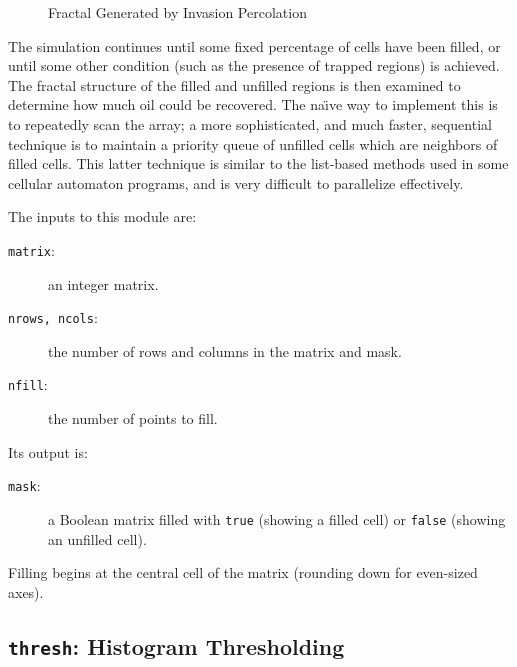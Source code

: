 \begin{figure}
\begin{center}
{\textwidth{}}
{\textwidth{}}
{\textwidth{}}
{\textwidth{}}
\end{center}
\caption{Fractal Generated by Invasion Percolation\label{f:invperc2}}
\end{figure}

The simulation continues until
some fixed percentage of cells have been filled,
or until some other condition
(such as the presence of trapped regions)
is achieved.
The fractal structure of the filled and unfilled regions
is then examined to determine how much oil could be recovered.
The na\"{\i}ve way to implement this is to repeatedly scan the array;
a more sophisticated, and much faster, sequential technique
is to maintain a priority queue of unfilled cells
which are neighbors of filled cells.
This latter technique is similar to the list-based methods used in some cellular automaton programs,
and is very difficult to parallelize effectively.

The inputs to this module are:
\begin{description}
\item[{\tt{matrix}}:]
	an integer matrix.
\item[{\tt{nrows, ncols}}:]
	the number of rows and columns in the matrix and mask.
\item[{\tt{nfill}}:]
	the number of points to fill.
\end{description}
Its output is:
\begin{description}
\item[{\tt{mask}}:]
	a Boolean matrix filled with {\tt{true}} (showing a filled cell) or {\tt{false}} (showing an unfilled cell).
\end{description}
Filling begins at the central cell of the matrix
(rounding down for even-sized axes).

\subsection{{\tt{thresh}}:
	Histogram Thresholding
	\label{s:toys-thresh}}

